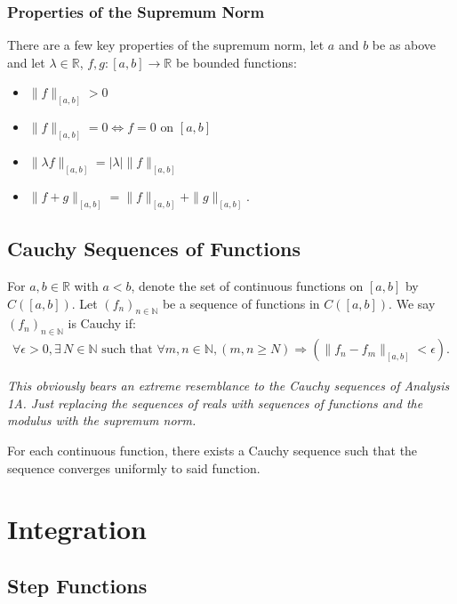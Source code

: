 \documentclass[a4paper, 12pt, twoside]{article}
\begin{document}
\subsubsection{Properties of the Supremum Norm}

There are a few key properties of the supremum norm, let $a$ and $b$
be as above and let $\lambda \in \mathbb{R}$, $f, g:[a, b]\to\mathbb{R}$
be bounded functions:

\begin{itemize}
      \item $\|f\|_{[a,b]} > 0$
      \item $\|f\|_{[a,b]} = 0 \Leftrightarrow f = 0 \text{ on } [a, b]$
      \item $\|\lambda f\|_{[a,b]} = |\lambda|\|f\|_{[a,b]}$
      \item $\|f+g\|_{[a,b]} = \|f\|_{[a,b]} + \|g\|_{[a,b]}.$
\end{itemize}

\subsection{Cauchy Sequences of Functions}

For $a, b \in \mathbb{R}$ with $a < b$, denote the set of continuous functions
on $[a,b]$ by $C([a,b])$. Let $(f_n)_{n\in \mathbb{N}}$ be a sequence of
functions in $C([a,b])$. We say $(f_n)_{n\in \mathbb{N}}$ is Cauchy if:
\begin{align*}
      \forall \epsilon > 0, \exists\,N \in \mathbb{N} \text{ such that }
      \forall m, n \in \mathbb{N}, (m, n \geq N) \Rightarrow (\|f_n - f_m\|_{[a,b]} <
      \epsilon).
\end{align*}

\textit{This obviously bears an extreme resemblance to the Cauchy sequences of
      Analysis 1A. Just replacing the sequences of reals with sequences of functions
      and the modulus with the supremum norm.}

\vspace{\baselineskip}

For each continuous function, there exists a Cauchy sequence such that the
sequence converges uniformly to said function.

\newpage

\section{Integration}

\subsection{Step Functions}
\end{document}
